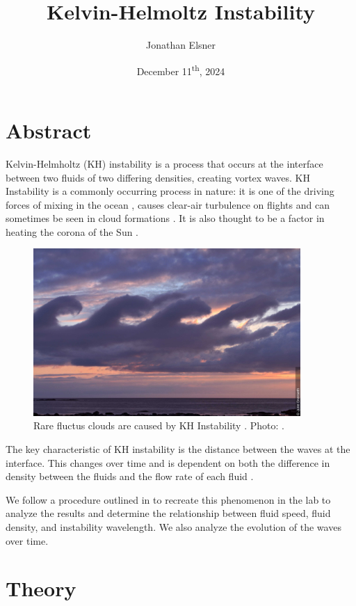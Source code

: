 \documentclass{article}
\title{Kelvin-Helmoltz Instability}
\author{Jonathan Elsner}
\date{December 11\textsuperscript{th}, 2024}
\begin{document}
\maketitle

\section{Abstract}

Kelvin-Helmholtz (KH) instability is a process that occurs at the interface
between two fluids of two differing densities, creating vortex waves. KH
Instability is a commonly occurring process in nature: it is one of the driving
forces of mixing in the ocean \cite{woods-1968}, causes clear-air turbulence on
flights and can sometimes be seen in cloud formations \cite{ludlam-1967}. It is
also thought to be a factor in heating the corona of the Sun
\cite{nasa-solar-surfer}.

\begin{figure}[h]
    \centering
    \includegraphics[width=4in]{kh-instability-clouds-2.jpg}
    \caption{Rare fluctus clouds are caused by KH Instability \cite{ludlam-1967}. Photo: \cite{fluctus-clouds}.}
    \label{img:fluctus-clouds}
\end{figure}

The key characteristic of KH instability is the distance between the waves at
the interface. This changes over time and is dependent on both the difference in
density between the fluids and the flow rate of each fluid \cite{kundu}.

We follow a procedure outlined in \cite{kh-instability-demo} to recreate this
phenomenon in the lab to analyze the results and determine the relationship
between fluid speed, fluid density, and instability wavelength. We also analyze
the evolution of the waves over time.

\section{Theory}
\end{document}
